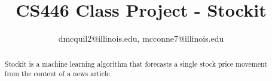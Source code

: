 \documentclass[11pt,letterpaper]{article}
\newcommand{\blue}[1]{\textcolor{RoyalBlue}{#1}}
\newcommand{\instructions}[1]{\blue{\textit{#1}}}
\begin{document}
\title{CS446 Class Project - Stockit}
\author{dmcquil2@illinois.edu, mcconne7@illinois.edu}
\maketitle




\begin{abstract}
Stockit is a machine learning algorithm that forecasts a single stock price movement
from the content of a news article.
\end{abstract}
\end{document}
